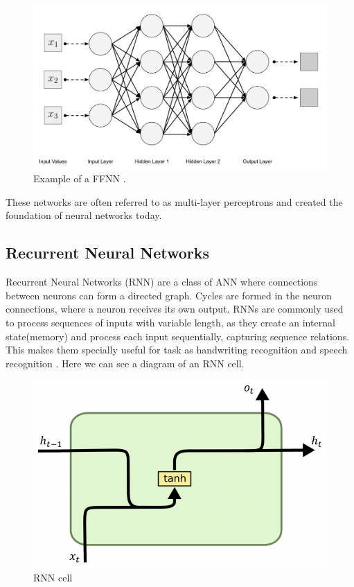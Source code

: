\documentclass{kththesis}
\begin{document}
\begin{figure}[H]
    \centering
    \includegraphics[width=0.6\linewidth]{images/background/fnn.png}
    \caption{Example of a FFNN \cite{ffnn}.}
    \label{FFNN}
\end{figure}

These networks are often referred to as multi-layer perceptrons and created the foundation of neural networks today.

\subsection{Recurrent Neural Networks}

Recurrent Neural Networks (RNN) are a class of ANN where connections between neurons can form a directed graph. Cycles are formed in the neuron connections, where a neuron receives its own output. RNNs are commonly used to process sequences of inputs with variable length, as they create an internal state(memory) and process each input sequentially, capturing sequence relations. This makes them specially useful for task as handwriting recognition \cite{rnn-hand} and speech recognition \cite{rnn-speech}. Here we can see a diagram of an RNN cell.

\begin{figure}[H]
    \centering
    \includegraphics[width=\textwidth]{images/background/RNN_core.png}
    \caption{RNN cell \cite{daniel}}
    \label{RNN}
\end{figure}
\end{document}
